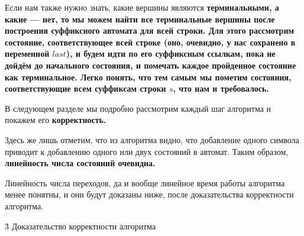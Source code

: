 Если нам также нужно знать, какие вершины являются \bf{терминальными}, а какие --- нет, то мы можем найти все терминальные вершины после построения суффиксного автомата для всей строки. Для этого рассмотрим состояние, соответствующее всей строке (оно, очевидно, у нас сохранено в переменной $last$), и будем идти по его суффиксным ссылкам, пока не дойдём до начального состояния, и помечать каждое пройденное состояние как терминальное. Легко понять, что тем самым мы пометим состояния, соответствующие всем суффиксам строки $s$, что нам и требовалось.

В следующем разделе мы подробно рассмотрим каждый шаг алгоритма и покажем его \bf{корректность}.

Здесь же лишь отметим, что из алгоритма видно, что добавление одного символа приводит к добавлению одного или двух состояний в автомат. Таким образом, \bf{линейность числа состояний} очевидна.

Линейность числа переходов, да и вообще линейное время работы алгоритма менее понятны, и они будут доказаны ниже, после доказательства корректности алгоритма.


\h3{ Доказательство корректности алгоритма }

